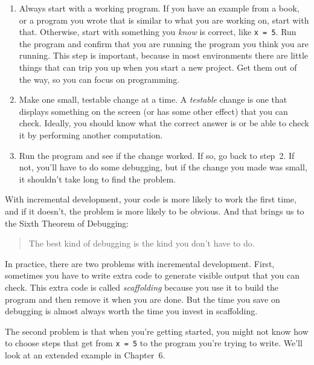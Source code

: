 \documentclass[../../book.tex]{subfiles}
\begin{document}
\begin{enumerate}

\item Always start with a working program.  If you have an
example from a book, or a program you wrote that is similar to
what you are working on, start with that.  Otherwise, start with
something you \emph{know}  is correct, like \lstinline{x = 5}.  Run the program
and confirm that you are running the program you think you are
running.
This step is important, because in most environments there
are little things that can trip you up when you start a new
project.  Get them out of the way, so you can focus on programming.

\item Make one small, testable change at a time.  A \emph{testable}
change is one that displays something on the screen (or has some
other effect) that you can check.  Ideally, you should know what
the correct answer is or be able to check it by performing another
computation.

\item Run the program and see if the change worked.  If so, go back
to step~2.  If not, you'll have to do some debugging, but if the
change you made was small, it shouldn't take long to find the problem.

\end{enumerate}


With incremental development, your code is more likely to work the first time, and if it doesn't, the problem is more likely to be obvious.  And that brings us to the Sixth Theorem of Debugging:

\begin{quote}
The best kind of debugging is the kind you don't have to do.
\end{quote}

In practice, there are two problems with incremental development.
First, sometimes you have to write extra code to
generate visible output that you can check.  This extra code is
called \emph{scaffolding} because you use it to build the program
and then remove it when you are done.  But the time you save on
debugging is almost always worth the time you invest in
scaffolding.

The second problem is that when you're getting started, you might not know how to
choose steps that get from \lstinline{x = 5} to the program you're trying
to write.  We'll look at an extended example in Chapter~6.
\end{document}
